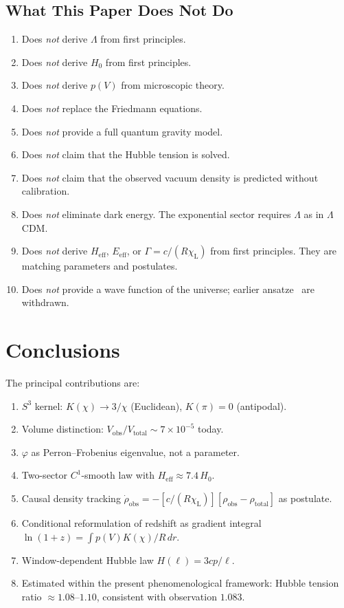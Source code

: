 \documentclass[12pt,a4paper]{amsart}
\theoremstyle{plain}
\theoremstyle{definition}
\theoremstyle{remark}
\newcommand{\vp}{\varphi}
\newcommand{\Sthree}{S^3}
\newcommand{\Hzero}{H_0}
\newcommand{\Heff}{H_{\mathrm{eff}}}
\newcommand{\Lam}{\ensuremath{\Lambda}}
\newcommand{\LCDM}{\ensuremath{\Lambda}CDM}
\newcommand{\Vtot}{V_{\mathrm{total}}}
\newcommand{\Vobs}{V_{\mathrm{obs}}}
\newcommand{\chiL}{\chi_{\mathrm{L}}}
\newcommand{\rhotot}{\rho_{\mathrm{total}}}
\newcommand{\rhoobs}{\rho_{\mathrm{obs}}}
\newcommand{\Eeff}{E_{\mathrm{eff}}}
\begin{document}
\subsection{What This Paper Does Not Do}

\begin{enumerate}[label=(N\arabic*),noitemsep]
\item Does \emph{not} derive $\Lam$ from first principles.
\item Does \emph{not} derive $\Hzero$ from first principles.
\item Does \emph{not} derive $p(V)$ from microscopic theory.
\item Does \emph{not} replace the Friedmann equations.
\item Does \emph{not} provide a full quantum gravity model.
\item Does \emph{not} claim that the Hubble tension is solved.
\item Does \emph{not} claim that the observed vacuum density is
  predicted without calibration.
\item Does \emph{not} eliminate dark energy. The exponential sector
  requires $\Lam$ as in \LCDM.
\item Does \emph{not} derive $\Heff$, $\Eeff$, or
  $\Gamma=c/(R\chiL)$ from first principles. They are matching
  parameters and postulates.
\item Does \emph{not} provide a wave function of the universe;
  earlier ansatze~\cite{Preece2025FBS3R_GoldenRatio} are withdrawn.
\end{enumerate}

\section*{Conclusions}

The principal contributions are:
\begin{enumerate}[noitemsep]
\item $\Sthree$ kernel: $K(\chi)\to 3/\chi$ (Euclidean), $K(\pi)=0$
  (antipodal).
\item Volume distinction: $\Vobs/\Vtot\sim 7\times 10^{-5}$ today.
\item $\vp$ as Perron--Frobenius eigenvalue, not a parameter.
\item Two-sector $C^1$-smooth law with $\Heff\approx 7.4\,H_0$.
\item Causal density tracking
  $\dot\rhoobs=-[c/(R\chiL)][\rhoobs-\rhotot]$ as postulate.
\item Conditional reformulation of redshift as gradient integral
  $\ln(1+z)=\int p(V)K(\chi)/R\,dr$.
\item Window-dependent Hubble law $H(\ell)=3cp/\ell$.
\item Estimated within the present phenomenological framework: Hubble tension ratio $\approx 1.08$--$1.10$, consistent with
  observation $1.083$.
\end{enumerate}
\end{document}
